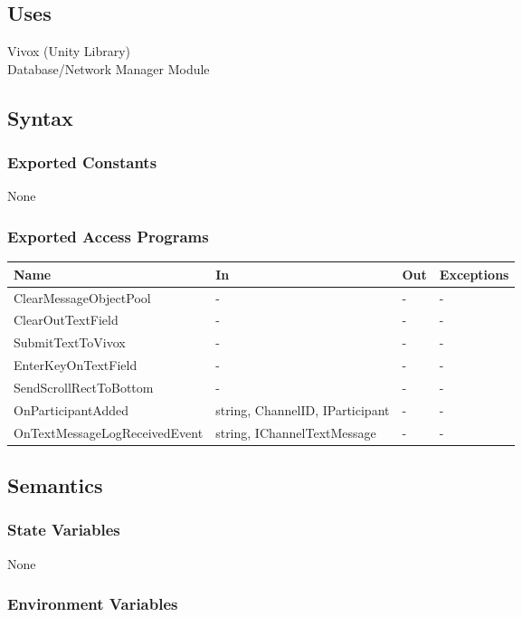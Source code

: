 \documentclass[12pt, titlepage]{article}
\begin{document}
\subsection{Uses}
Vivox (Unity Library)\\
Database/Network Manager Module

\subsection{Syntax}

\subsubsection{Exported Constants}
None

\subsubsection{Exported Access Programs}

\begin{center}
\begin{tabular}{p{6cm} p{4cm} p{4cm} p{2cm}}
\hline
\textbf{Name} & \textbf{In} & \textbf{Out} & \textbf{Exceptions} \\
\hline
ClearMessageObjectPool & - & - & - \\
ClearOutTextField & - & - & - \\
SubmitTextToVivox & - & - & - \\
EnterKeyOnTextField & - & - & - \\
SendScrollRectToBottom & - & - & - \\
OnParticipantAdded & string, ChannelID, IParticipant & - & - \\
OnTextMessageLogReceivedEvent & string, IChannelTextMessage & - & - \\
\hline
\end{tabular}
\end{center}

\subsection{Semantics}

\subsubsection{State Variables}
None
\subsubsection{Environment Variables}
\end{document}
